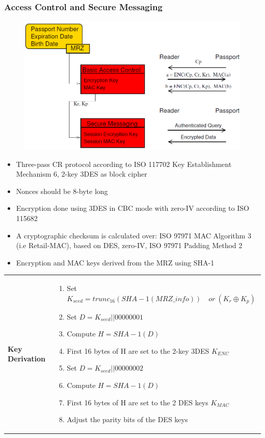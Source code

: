 \subsubsection{Access Control and Secure Messaging}
\begin{figure}[ht!]
    \centering
    \includegraphics[scale=0.5]{img/access-control}
\end{figure}
\begin{itemize}
    \item Three-pass CR protocol according to ISO 11770\text{-}2 Key Establishment
    Mechanism 6, 2-key 3DES as block cipher
    \item Nonces should be 8-byte long
    \item Encryption done using 3DES in CBC mode with zero-IV according to
    ISO 11568\text{-}2
    \item A cryptographic checksum is calculated over: ISO 9797\text{-}1 MAC
    Algorithm 3 (i.e Retail-MAC), based on DES, zero-IV, ISO 9797\text{-}1 Padding
    Method 2
    \item Encryption and MAC keys derived from the MRZ using SHA-1
\end{itemize}

\begin{tabular}{m{3cm}m{11cm}}
\textbf{Key Derivation} &
\begin{enumerate}
    \item Set $ K_{seed} = trunc_{16}(SHA-1(MRZ\_info))\quad or\ (K_r \oplus K_p)$
    \item Set $ D = K_{seed}||00000001 $
    \item Compute $ H = SHA-1(D) $
    \item First 16 bytes of H are set to the 2-key 3DES $ K_{ENC} $
    \item Set $ D = K_{seed}||00000002 $
    \item Compute $ H = SHA-1(D) $
    \item First 16 bytes of H are set to the 2 DES keys $K_{MAC} $
    \item Adjust the parity bits of the DES keys
\end{enumerate}
\end{tabular}

